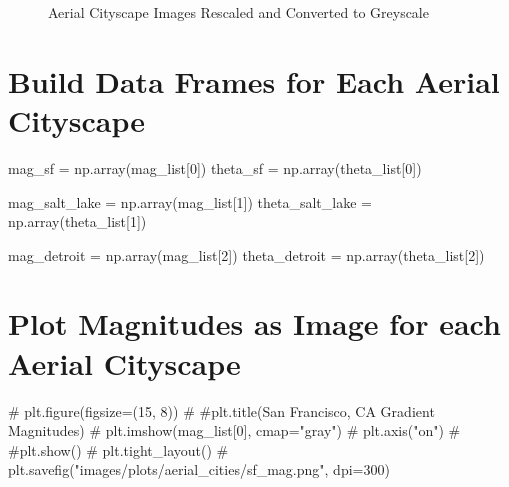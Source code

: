 \documentclass[
  letterpaper,
  DIV=11,
  numbers=noendperiod]{scrreprt}
\newenvironment{Shaded}{\begin{snugshade}}{\end{snugshade}}
\newcommand{\CommentTok}[1]{\textcolor[rgb]{0.37,0.37,0.37}{#1}}
\newcommand{\DecValTok}[1]{\textcolor[rgb]{0.68,0.00,0.00}{#1}}
\newcommand{\NormalTok}[1]{\textcolor[rgb]{0.00,0.23,0.31}{#1}}
\newcommand{\OperatorTok}[1]{\textcolor[rgb]{0.37,0.37,0.37}{#1}}
\begin{document}
\begin{figure}
\begin{minipage}{0.33\linewidth}
\begin{figure}[H]
{}


\end{figure}%

\end{minipage}%

\caption{\label{fig-city-images}Aerial Cityscape Images Rescaled and
Converted to Greyscale}

\end{figure}%

\section{Build Data Frames for Each Aerial
Cityscape}\label{build-data-frames-for-each-aerial-cityscape}

\begin{Shaded}
\begin{Highlighting}[]
\NormalTok{mag\_sf }\OperatorTok{=}\NormalTok{ np.array(mag\_list[}\DecValTok{0}\NormalTok{])}
\NormalTok{theta\_sf }\OperatorTok{=}\NormalTok{ np.array(theta\_list[}\DecValTok{0}\NormalTok{])}


\NormalTok{mag\_salt\_lake }\OperatorTok{=}\NormalTok{ np.array(mag\_list[}\DecValTok{1}\NormalTok{])}
\NormalTok{theta\_salt\_lake }\OperatorTok{=}\NormalTok{ np.array(theta\_list[}\DecValTok{1}\NormalTok{])}


\NormalTok{mag\_detroit }\OperatorTok{=}\NormalTok{ np.array(mag\_list[}\DecValTok{2}\NormalTok{])}
\NormalTok{theta\_detroit }\OperatorTok{=}\NormalTok{ np.array(theta\_list[}\DecValTok{2}\NormalTok{])}
\end{Highlighting}
\end{Shaded}

\section{Plot Magnitudes as Image for each Aerial
Cityscape}\label{plot-magnitudes-as-image-for-each-aerial-cityscape}

\begin{Shaded}
\begin{Highlighting}[]

\CommentTok{\# plt.figure(figsize=(15, 8))}
\CommentTok{\# \#plt.title(\textquotesingle{}San Francisco, CA Gradient Magnitudes\textquotesingle{})}
\CommentTok{\# plt.imshow(mag\_list[0], cmap="gray")}
\CommentTok{\# plt.axis("on")}
\CommentTok{\# \#plt.show()}
\CommentTok{\# plt.tight\_layout()}
\CommentTok{\# plt.savefig("images/plots/aerial\_cities/sf\_mag.png", dpi=300)}
\end{Highlighting}
\end{Shaded}
\end{document}
